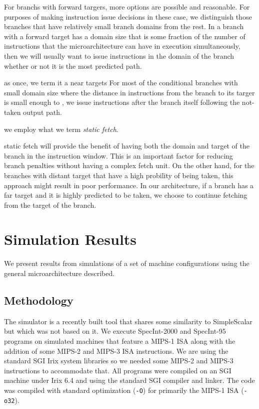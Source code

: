 \documentclass[10pt,dvips]{article}
\begin{document}
For branchs with forward targers, more options are possible and
reasonable.
For purposes of making instruction issue decisions in these case, we 
distinguish
those branches that have relatively small branch domains from 
the rest.  In a branch with a forward target has a domain 
size that is some fraction of
the number of instructions that the microarchitecture can have
in execution simultaneously, then we will usually want to
issue instructions in the domain of the branch whether or not
it is the most predicted path.

as once, we term it a 
near targets
For most of the conditional branches with small domain size
where the distance in instructions from the 
branch to its targer is small enough to , 
we issue instructions after the branch itself following the not-taken
output path.

we employ what we term
\textit{static fetch}.

static fetch will
provide the benefit of having both the domain and target of the branch 
in the instruction window.  This is an important factor for reducing
branch penalties without having a complex fetch unit.  On the other
hand, for the branches with distant target that have a high
probility of being taken, this approach might result in poor performance.
In our architecture, if a branch has a far target and it is highly predicted
to be taken, we choose to continue fetching from the target of the branch.

%
\section{Simulation Results}
%
We present results from simulations of a set of machine configurations
using the general microarchitecture described.
%
\subsection{Methodology}
%
The simulator is a recently built tool that shares some similarity
to SimpleScalar \cite{Austin97} but which was not based on it.
We execute
SpecInt-2000 and SpecInt-95 programs on simulated machines
that feature a MIPS-1 ISA along with the addition of some MIPS-2 and
MIPS-3 ISA instructions.  We are using the standard SGI Irix system
libraries so we needed some MIPS-2 and MIPS-3 instructions to accommodate
that.  All programs were compiled on an SGI machine under Irix 6.4 and
using the standard SGI compiler and linker.  The code was compiled with
standard optimization ({\tt -O}) for primarily the MIPS-1 ISA ({\tt -o32}).
%
\end{document}
